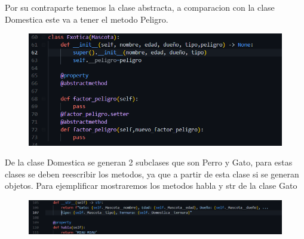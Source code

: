 \documentclass[12pt]{article}
\begin{document}
Por su contraparte tenemos la clase abstracta, a comparacion con la clase Domestica este va a tener el metodo Peligro.
\begin{figure}[H]
		\begin{center}
 			\includegraphics[width = .9\textwidth]{11.png}
 			
 			 	
		\end{center} 
\end{figure}

De la clase Domestica se generan 2 subclases que son Perro y Gato, para estas clases se deben reescribir los metodos, ya que a partir de esta clase si se generan objetos. Para ejemplificar mostraremos los metodos habla y str de la clase Gato
\begin{figure}[H]
		\begin{center}
 			\includegraphics[width = .9\textwidth]{12.png}
 			
 			 	
		\end{center} 
\end{figure}
\end{document}
